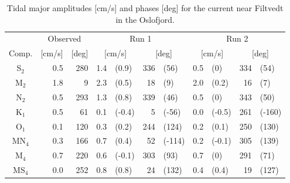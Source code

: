 \begin{table}[ht]
\caption{Tidal major amplitudes [cm/s] and phases [deg] for the current near Filtvedt in the Oslofjord.}
\label{tab:Filtvedt}
\centering
\begin{tabular}{crrr@{ }lr@{ }lr@{ }lr@{ }l} \hline
      & \multicolumn{2}{c}{Observed} & \multicolumn{4}{c}{Run 1} & \multicolumn{4}{c}{Run 2} \\%
Comp. & [cm/s] & [deg] & \multicolumn{2}{c}{[cm/s]} & \multicolumn{2}{c}{[deg]} & \multicolumn{2}{c}{[cm/s]} & \multicolumn{2}{c}{[deg]} \\%
S$_2$   &  0.5 & 280  &   1.4 & (0.9)  & 336 & (56)   &  0.5 & (0)    & 334 & (54)   \\ %
M$_2$   &  1.8 &   9  &   2.3 & (0.5)  &  18 & (9)    &  2.0 & (0.2)  &  16 & (7)    \\ %
N$_2$   &  0.5 & 293  &   1.3 & (0.8)  & 339 & (46)   &  0.5 & (0)    & 343 & (50)   \\ %
K$_1$   &  0.5 &  61  &   0.1 & (-0.4) &   5 & (-56)  &  0.0 & (-0.5) & 261 & (-160) \\ %
O$_1$   &  0.1 & 120  &   0.3 & (0.2)  & 244 & (124)  &  0.2 & (0.1)  & 250 & (130)  \\ %
MN$_4$  &  0.3 & 166  &   0.7 & (0.4)  &  52 & (-114) &  0.2 & (-0.1) & 305 & (139)  \\ %
M$_4$   &  0.7 & 220  &   0.6 & (-0.1) & 303 & (93)   &  0.7 & (0)    & 291 & (71)   \\ %
MS$_4$  &  0.0 & 252  &   0.8 & (0.8)  &  24 & (132)  &  0.4 & (0.4)  &  19 & (127)  \\ %
\hline 
\end{tabular}
\end{table}

